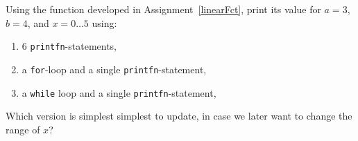 \label{table} Using the function developed in Assignment~\ref{linearFct}, print its value for $a=3$, $b=4$, and $x=0\ldots5$ using:
\begin{enumerate}
\item 6 \lstinline!printfn!-statements,
\item a \lstinline!for!-loop and a single \lstinline!printfn!-statement,
\item a \lstinline!while! loop and a single \lstinline!printfn!-statement,
\end{enumerate}
Which version is simplest simplest to update, in case we later want to change the range of $x$?

